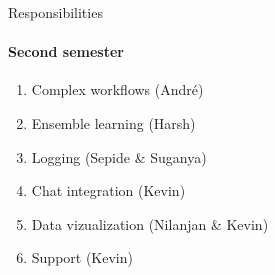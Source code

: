 \begin{frame}{Responsibilities}
\framesubtitle{Second semester}
	\begin{enumerate}
		\item Complex workflows (André)
		\item Ensemble learning  (Harsh)
		\item Logging (Sepide \& Suganya)
		\item Chat integration (Kevin)
		\item Data vizualization (Nilanjan \& Kevin)
		\item Support (Kevin)
	\end{enumerate}
\end{frame}